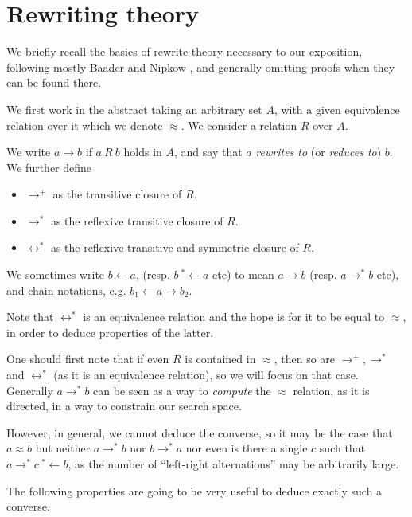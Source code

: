 \chapter{Rewriting theory}\label{rewriting-chapter}
We briefly recall the basics of rewrite theory necessary to our exposition, following mostly Baader and Nipkow \cite{traat}, and generally omitting proofs when they can be found there.

We first work in the abstract taking an arbitrary set $A$, with a given equivalence relation over it which we denote $\approx$. We consider a relation $R$ over $A$.

\begin{definition}
  We write $a \rightarrow b$ if $a\ R\ b$ holds in $A$, and say that $a$ \emph{rewrites to} (or \emph{reduces to}) $b$. We further define
  \begin{itemize}
    \item $\rightarrow^+$ as the transitive closure of $R$.
    \item $\rightarrow^*$ as the reflexive transitive closure of $R$.
    \item $\leftrightarrow^*$ as the reflexive transitive and symmetric closure of $R$.
  \end{itemize}
  We sometimes write $b\leftarrow a$, (resp. $b\ {}^*\leftarrow a$ etc) to mean $a\rightarrow b$ (resp. $a\rightarrow^*b$ etc), and chain notations, e.g. $b_1\leftarrow a\rightarrow b_2$.
\end{definition}

Note that $\leftrightarrow^*$ is an equivalence relation and the hope is for it to be equal to $\approx$, in order to deduce properties of the latter.

One should first note that if even $R$ is contained in $\approx$, then so are $\rightarrow^+, \rightarrow^*$ and $\leftrightarrow^*$ (as it is an equivalence relation), so we will focus on that case. Generally $a \rightarrow^* b$ can be seen as a way to \emph{compute} the $\approx$ relation, as it is directed, in a way to constrain our search space.

However, in general, we cannot deduce the converse, so it may be the case that $a\approx b$ but neither $a\rightarrow^*b$ nor $b\rightarrow^*a$ nor even is there a single $c$ such that $a\rightarrow^* c\ {}^*\leftarrow b$, as the number of ``left-right alternations'' may be arbitrarily large.

The following properties are going to be very useful to deduce exactly such a converse.

